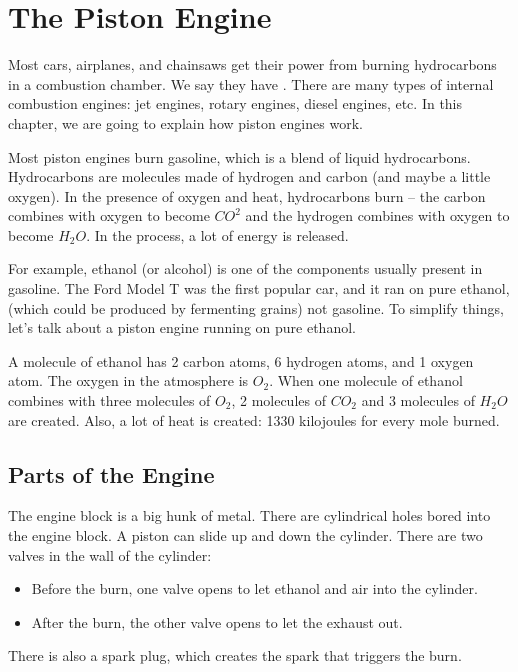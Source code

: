 \chapter{The Piston Engine}

Most cars,  airplanes,  and chainsaws get their power from burning hydrocarbons in a 
combustion chamber.   We say they have .   There are many types of internal combustion engines: jet engines, rotary engines, diesel engines, etc.  In this chapter, we are 
going to explain how piston engines work. 

Most piston engines burn gasoline,  which is a blend of liquid hydrocarbons.  Hydrocarbons are molecules made of hydrogen and carbon (and maybe a little oxygen).  In the presence of oxygen and heat,  hydrocarbons burn -- the carbon combines with oxygen to become $CO^2$ and the hydrogen combines with oxygen to become $H_2O$.  In the process,  a lot of energy is released.

For example,  ethanol (or alcohol) is one of the components usually present in gasoline.  The Ford Model T was the first popular car, and it ran on pure ethanol, (which could be produced by fermenting grains) not gasoline.  To simplify things, let's talk about a piston engine running on pure ethanol.

A molecule of ethanol has 2 carbon atoms, 6 hydrogen atoms, and 1 oxygen atom.  The oxygen in the atmosphere is $O_2$.   When one molecule of ethanol combines with three molecules of $O_2$,  2 molecules of $CO_2$ and 3 molecules of $H_2O$ are created.  Also, a lot of heat is created: 1330 kilojoules for every mole burned.

\section{Parts of the Engine}

The engine block is a big hunk of metal.  There are cylindrical holes bored into the engine block.  A piston can slide up and down the cylinder.  There are two valves in the wall of the cylinder:  
\begin{itemize}
\item Before the burn, one valve opens to let ethanol and air into the cylinder.
\item After the burn,  the other valve opens to let the exhaust out.
\end{itemize}

There is also a spark plug,   which creates the spark that triggers the burn.

